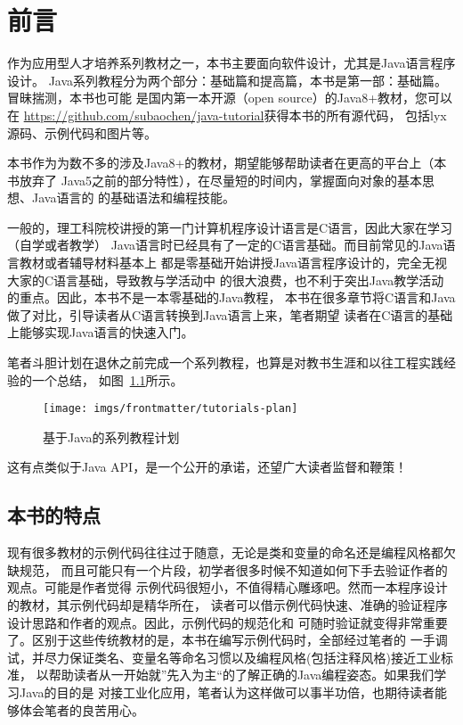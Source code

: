 \frontmatter
\chapter{前言}
作为应用型人才培养系列教材之一，本书主要面向软件设计，尤其是Java语言程序设计。
Java系列教程分为两个部分：基础篇和提高篇，本书是第一部：基础篇。冒昧揣测，本书也可能
是国内第一本开源（open source）的Java8+教材，您可以在
\url{https://github.com/subaochen/java-tutorial}获得本书的所有源代码，
包括lyx源码、示例代码和图片等。

本书作为为数不多的涉及Java8+的教材，期望能够帮助读者在更高的平台上（本书放弃了
Java5之前的部分特性），在尽量短的时间内，掌握面向对象的基本思想、Java语言的
的基础语法和编程技能。

一般的，理工科院校讲授的第一门计算机程序设计语言是C语言，因此大家在学习（自学或者教学）
Java语言时已经具有了一定的C语言基础。而目前常见的Java语言教材或者辅导材料基本上
都是零基础开始讲授Java语言程序设计的，完全无视大家的C语言基础，导致教与学活动中
的很大浪费，也不利于突出Java教学活动的重点。因此，本书不是一本零基础的Java教程，
本书在很多章节将C语言和Java做了对比，引导读者从C语言转换到Java语言上来，笔者期望
读者在C语言的基础上能够实现Java语言的快速入门。

笔者斗胆计划在退休之前完成一个系列教程，也算是对教书生涯和以往工程实践经验的一个总结，
如图~\ref{fig:tutorial-plan}所示。

\begin{figure}[htbp]
    \centering
    \texttt{[image: imgs/frontmatter/tutorials-plan]}
    \caption{基于Java的系列教程计划}
    \label{fig:tutorial-plan}
\end{figure}

这有点类似于Java API，是一个公开的承诺，还望广大读者监督和鞭策！

\section*{本书的特点}
现有很多教材的示例代码往往过于随意，无论是类和变量的命名还是编程风格都欠缺规范，
而且可能只有一个片段，初学者很多时候不知道如何下手去验证作者的观点。可能是作者觉得
示例代码很短小，不值得精心雕琢吧。然而一本程序设计的教材，其示例代码却是精华所在，
读者可以借示例代码快速、准确的验证程序设计思路和作者的观点。因此，示例代码的规范化和
可随时验证就变得非常重要了。区别于这些传统教材的是，本书在编写示例代码时，全部经过笔者的
一手调试，并尽力保证类名、变量名等命名习惯以及编程风格(包括注释风格)接近工业标准，
以帮助读者从一开始就”先入为主“的了解正确的Java编程姿态。如果我们学习Java的目的是
对接工业化应用，笔者认为这样做可以事半功倍，也期待读者能够体会笔者的良苦用心。

